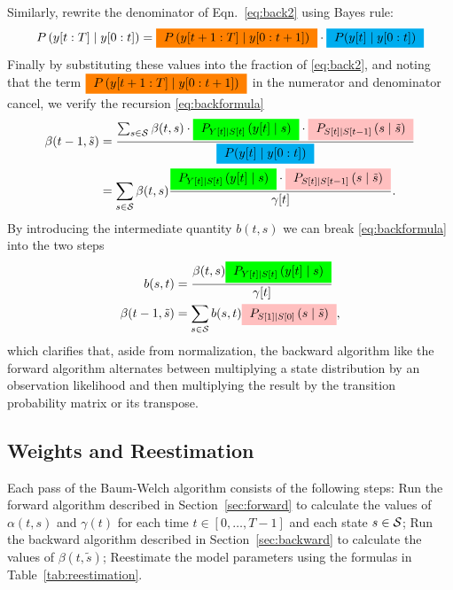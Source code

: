 Similarly, rewrite the denominator of Eqn.~\eqref{eq:back2} using
Bayes rule:
\begin{equation*}
  P \left(\ts{y}{t}{T}\given \ts{y}{0}{t} \right) = \FuturePast \cdot {
  \gammax}
\end{equation*}
Finally by substituting these values into the fraction of
\eqref{eq:back2}, and noting that the term $\FuturePast$ in the
numerator and denominator cancel, we verify the recursion
\eqref{eq:backformula}
\begin{align*}
  \beta(t-1,{\tilde s})
  &= \frac{\sum_{s\in\states}\beta(t,s) \cdot \BackUpdate{t} \cdot
    \Backcast{t}{t-1}{\tilde s}} { \gammax} \\
  &= \sum_{s\in\states} \beta(t,s) \frac{ \BackUpdate{t} \cdot
    \Backcast{t}{t-1}{\tilde s}} {\ti{\gamma}{t}}.
\end{align*}
By introducing the intermediate quantity $b(t,s)$ we can break
\eqref{eq:backformula} into the two steps
\begin{subequations}
  \label{eq:2LineBackward}
  \begin{align}
    \mlabel{eq:back5}
    b(s,t) &= \frac{\beta(t,s) \BackUpdate{t}}{\ti{\gamma}{t}} \\
    \mlabel{eq:back6}
    \beta(t-1,\tilde s) &= \sum_{s\in\states} b(s,t)
                          \Backcast{1}{0}{\tilde s},
  \end{align}
\end{subequations}
which clarifies that, aside from normalization, the backward algorithm
like the forward algorithm alternates between multiplying a state
distribution by an observation likelihood and then multiplying the
result by the transition probability matrix or its transpose.

\subsection{Weights and Reestimation}
\label{sec:reestimation}

Each pass of the Baum-Welch algorithm consists of the following steps:
Run the forward algorithm described in Section~\ref{sec:forward} to
calculate the values of $\alpha(t,s)$ and $\gamma(t)$ for each time $t
\in [0,\ldots,T-1]$ and each state $s \in \states$; Run the backward
algorithm described in Section~\ref{sec:backward} to calculate the
values of $\beta(t,{\tilde s})$; Reestimate the model parameters using the
formulas in Table~\ref{tab:reestimation}.

